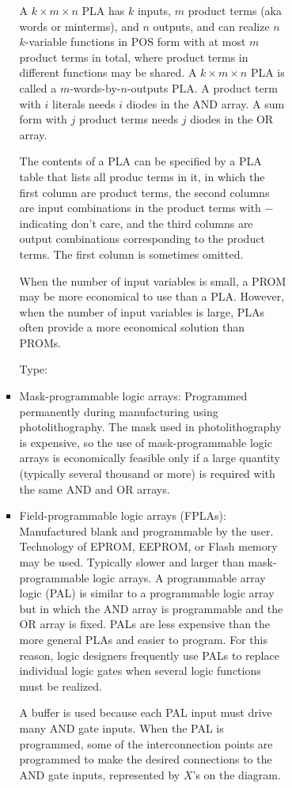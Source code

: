 \documentclass[a4paper,12pt]{article}
\begin{document}
\begin{itemize}
\begin{itemize}
\begin{itemize}
\begin{itemize}
\begin{itemize}
\begin{itemize}
\begin{itemize}
A $k\times m\times n$ PLA has $k$ inputs, $m$ product terms (aka words or minterms), and $n$ outputs, and can realize $n$ $k$-variable functions in POS form with at most $m$ product terms in total, where product terms in different functions may be shared. A $k\times m\times n$ PLA is called a $m$-words-by-$n$-outputs PLA. A product term with $i$ literals needs $i$ diodes in the AND array. A sum form with $j$ product terms needs $j$ diodes in the OR array.

The contents of a PLA can be specified by a PLA table that lists all produc terms in it, in which the first column are product terms, the second columns are input combinations in the product terms with $-$ indicating don't care, and the third columns are output combinations corresponding to the product terms. The first column is sometimes omitted.

When the number of input variables is small, a PROM may be more economical to use than a PLA. However, when the number of input variables is large, PLAs often provide a more economical solution than PROMs.

Type:
\bit
\item Mask-programmable logic arrays: Programmed permanently during manufacturing using photolithography. The mask used in photolithography is expensive, so the use of mask-programmable logic arrays is economically feasible only if a large quantity (typically several thousand or more) is required with the same AND and OR arrays.
\item Field-programmable logic arrays (FPLAs): Manufactured blank and programmable by the user. Technology of EPROM, EEPROM, or Flash memory may be used. Typically slower and larger than mask-programmable logic arrays.
\eit
{}
A programmable array logic (PAL) is similar to a programmable logic array but in which the AND array is programmable and the OR array is fixed. PALs are less expensive than the more general PLAs and easier to program. For this reason, logic designers frequently use PALs to replace individual logic gates when several logic functions must be realized.

A buffer is used because each PAL input must drive many AND gate inputs. When the PAL is programmed, some of the interconnection points are programmed to make the desired connections to the AND gate inputs, represented by $X$'s on the diagram.


\end{itemize}
\end{itemize}
\end{itemize}
\end{itemize}
\end{itemize}
\end{itemize}
\end{itemize}
\end{document}
